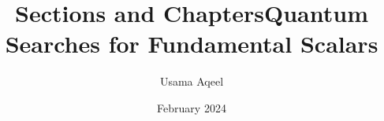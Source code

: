 \documentclass[17pt]{report}
\title{Sections and Chapters}
\title{Quantum Searches for Fundamental Scalars}
\author{Usama Aqeel}
\date{February 2024}
\numberwithin{equation}{subsection}
\numberwithin{figure}{subsection}
\numberwithin{equation}{section}
\numberwithin{figure}{section}
\begin{document}
\maketitle
\newpage
\tableofcontents
\newpage

\newpage

\newpage 








\begin{appendices}




\end{appendices}
\end{document}
